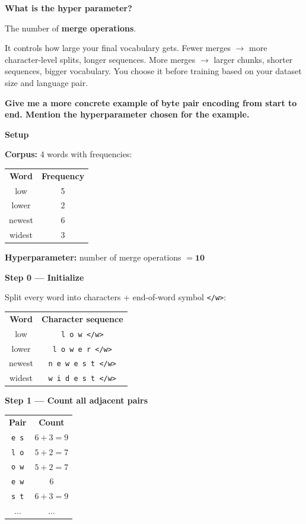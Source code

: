 \bigskip

\textbf{What is the hyper parameter?}

The number of \textbf{merge operations}.

It controls how large your final vocabulary gets. Fewer merges $\to$ more character-level splits, longer sequences. More merges $\to$ larger chunks, shorter sequences, bigger vocabulary. You choose it before training based on your dataset size and language pair.

\bigskip

\textbf{Give me a more concrete example of byte pair encoding from start to end. Mention the hyperparameter chosen for the example.}

\noindent\textbf{Setup}

\noindent\textbf{Corpus:} 4 words with frequencies:

\begin{center}
\begin{tabular}{c|c}
\textbf{Word} & \textbf{Frequency} \\
low & 5 \\
lower & 2 \\
newest & 6 \\
widest & 3 \\
\end{tabular}
\end{center}

\noindent\textbf{Hyperparameter:} number of merge operations $= \mathbf{10}$

\medskip
\noindent\textbf{Step 0 --- Initialize}

Split every word into characters + end-of-word symbol \texttt{</w>}:

\begin{center}
\begin{tabular}{c|c}
\textbf{Word} & \textbf{Character sequence} \\
low    & \texttt{l o w </w>} \\
lower  & \texttt{l o w e r </w>} \\
newest & \texttt{n e w e s t </w>} \\
widest & \texttt{w i d e s t </w>} \\
\end{tabular}
\end{center}

\medskip
\noindent\textbf{Step 1 --- Count all adjacent pairs}

\begin{center}
\begin{tabular}{c|c}
\textbf{Pair} & \textbf{Count} \\
\texttt{e s} & $6+3 = 9$ \\
\texttt{l o} & $5+2 = 7$ \\
\texttt{o w} & $5+2 = 7$ \\
\texttt{e w} & 6 \\
\texttt{s t} & $6+3 = 9$ \\
$\ldots$     & $\ldots$ \\
\end{tabular}
\end{center}

